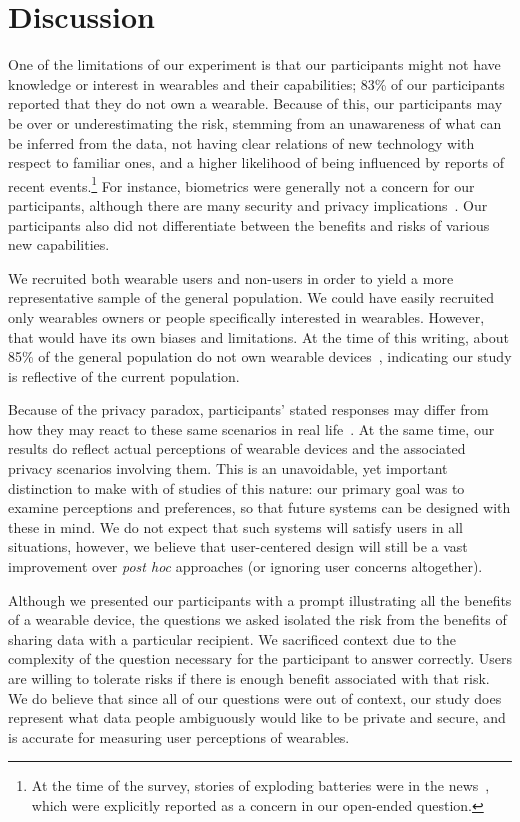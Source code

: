\documentclass{sig-alternate-hotpets15}
\begin{document}
\section{Discussion}

One of the limitations of our experiment is that our participants might not have knowledge or interest in wearables and their capabilities; 83\% of our participants reported that they do not own a wearable. Because of this, our participants may be over or underestimating the risk, stemming from an unawareness of what can be inferred from the data, not having clear relations of new technology with respect to familiar ones, and a higher likelihood of being influenced by reports of recent events.\footnote{At the time of the survey, stories of exploding batteries were in the news~\cite{1_levin_2014}, which were explicitly reported as a concern in our open-ended question.}  For instance, biometrics were generally not a concern for our participants, although there are many security and privacy implications~\cite{prabhakar2003biometric}. Our participants also did not differentiate between the benefits and risks of various new capabilities.

We recruited both wearable users and non-users in order to yield a more representative sample of the general population. We could have easily recruited only wearables owners or people specifically interested in wearables. However, that would have its own biases and limitations. At the time of this writing, about 85\% of the general population do not own wearable devices~\cite{Nilsen,WearableStatNews}, indicating our study is reflective of the current population. 

Because of the privacy paradox, participants' stated responses may differ from how they may react to these same scenarios in real life~\cite{norberg2007privacy, jensen2005privacy}. At the same time, our results do reflect actual perceptions of wearable devices and the associated privacy scenarios involving them. This is an unavoidable, yet important distinction to make with of studies of this nature: our primary goal was to examine perceptions and preferences, so that future systems can be designed with these in mind. We do not expect that such systems will satisfy users in all situations, however, we believe that user-centered design will still be a vast improvement over {\it post hoc} approaches (or ignoring user concerns altogether). 

Although we presented our participants with a prompt illustrating all the benefits of a wearable device, the questions we asked isolated the risk from the benefits of sharing data with a particular recipient. We sacrificed context due to the complexity of the question necessary for the participant to answer correctly. Users are willing to tolerate risks if there is enough benefit associated with that risk. We do believe that since all of our questions were out of context, our study does represent what data people ambiguously would like to be private and secure, and is accurate for measuring user perceptions of wearables.\\
\end{document}
